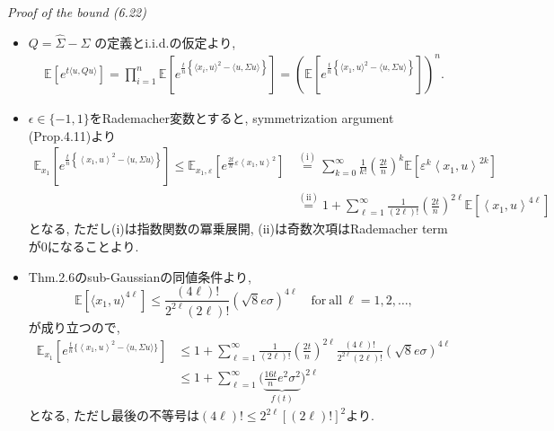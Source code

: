 \documentclass[unicode,aspectratio=169,11pt]{beamer}
\newcommand{\ex}{\mathbb{E}}
\begin{document}
\begin{frame}{}{}
  {\it Proof of the bound (6.22)}
  \begin{itemize}
    \item $Q = \widehat{\Sigma} - \Sigma$ の定義とi.i.d.の仮定より,
          \begin{align*}
            \ex\left[e^{t\langle u, Qu\rangle}\right]
            = \prod_{i=1}^n \ex\left[e^{\frac{t}{n}\left\{\langle x_i, u\rangle^2 - \langle u, \Sigma u\rangle\right\}}\right]
            = \left( \ex\left[e^{\frac{t}{n}\left\{\langle x_1, u\rangle^2 - \langle u, \Sigma u\rangle\right\}}\right] \right)^n.
            \tag{6.23}
          \end{align*}
    \item $\epsilon \in \{-1, 1\}$をRademacher変数とすると, symmetrization argument (Prop.4.11)より
          \begin{align*}
            \mathbb{E}_{x_{1}}\left[e^{\frac{t}{n}\left\{\left\langle x_{1}, u\right\rangle^{2}-\langle u, \Sigma u\rangle\right\}}\right]
            \leq \mathbb{E}_{x_{1}, \varepsilon}\left[e^{\frac{2 t}{n} \varepsilon\left\langle x_{1}, u\right\rangle^{2}}\right]
            & \stackrel{(\mathrm{i})}{=} \sum_{k=0}^{\infty} \frac{1}{k !}\left(\frac{2 t}{n}\right)^{k} \mathbb{E}\left[\varepsilon^{k}\left\langle x_{1}, u\right\rangle^{2 k}\right] \\
            & \stackrel{(\mathrm{ii})}{=} 1+\sum_{\ell=1}^{\infty} \frac{1}{(2 \ell) !}\left(\frac{2 t}{n}\right)^{2 \ell} \mathbb{E}\left[\left\langle x_{1}, u\right\rangle^{4 \ell}\right]
          \end{align*}
          となる, ただし(i)は指数関数の冪乗展開, (ii)は奇数次項はRademacher termが$0$になることより.
  \end{itemize}
\end{frame}

\begin{frame}{}{}
  \begin{itemize}
    \item Thm.2.6のsub-Gaussianの同値条件より,
            \[
              \ex\left[ \langle x_1, u\rangle^{4\ell} \right]
              \le \frac{(4\ell)!}{2^{2\ell}(2\ell)!}(\sqrt{8}e\sigma)^{4\ell}
              \quad \mathrm{for\ all}\ \ell = 1,2,\dots,
            \]
            が成り立つので,
            \begin{align*}
              \mathbb{E}_{x_{1}}\left[e^{\frac{t}{n}\{\left\langle x_{1}, u\right\rangle^{2}-\langle u, \Sigma u\rangle\}}\right] & \leq 1+\sum_{\ell=1}^{\infty} \frac{1}{(2 \ell) !}\left(\frac{2 t}{n}\right)^{2 \ell} \frac{(4 \ell) !}{2^{2 \ell}(2 \ell) !}(\sqrt{8} e \sigma)^{4 \ell} \\
              & \leq 1+\sum_{\ell=1}^{\infty}\Bigg(\underbrace{\frac{16 t}{n} e^{2} \sigma^{2}}_{f(t)}\Bigg)^{2 \ell}
            \end{align*}
            となる, ただし最後の不等号は$(4\ell)! \le 2^{2\ell}[(2\ell)!]^2$より.
  \end{itemize}
\end{frame}
\end{document}
